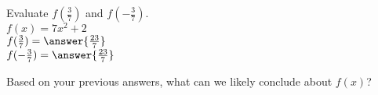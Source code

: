 \documentclass{ximera}
\author{David Kish}
\begin{document}
\begin{exercise}
Evaluate $f(\frac{3}{7})$ and $f(-\frac{3}{7})$.\\
$f(x)= 7x^2+ 2$\\
$f(\frac{3}{7})=\answer{\frac{23}{7}}$\\
$f(-\frac{3}{7})=\answer{\frac{23}{7}}$
\end{exercise}
\begin{exercise}
Based on your previous answers, what can we likely conclude about $f(x)$?
\begin{multipleChoice}
\end{multipleChoice}
\end{exercise}
\end{document}
